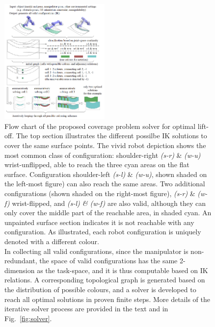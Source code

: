 \documentclass[journal]{IEEEtran}
\begin{document}
\begin{figure}[t]
\centering
\includegraphics[width = 0.48\textwidth]{figures/other_figures/newflowchart_3}
\caption{Flow chart of the proposed coverage problem solver for optimal lift-off. 
The top section illustrates the different possilbe IK solutions to cover the same surface points. The vivid robot depiction shows the most common class of configuration: shoulder-right \textit{(s-r)} \& \textit{(w-u)} wrist-unflipped, able to reach the three cyan areas on the flat surface. Configuration shoulder-left \textit{(s-l)} \& \textit{(w-u)}, shown shaded on the left-most figure) can also reach the same areas. Two additional configurations (shown shaded on the right-most figure), \textit{(s-r)} \& \textit{(w-f)} wrist-flipped, and \textit{(s-l) \& (w-f)} are also valid, although they can only cover the middle part of the reachable area, in shaded cyan. An unpainted surface section indicates it is not reachable with any configuration. As illustrated, each robot configuration is uniquely denoted with a different colour. \protect\\ 
In collecting all valid configurations, since the manipulator is non-redundant, the space of valid configurations has the same 2-dimension as the task-space, and it is thus computable based on IK relations. A corresponding topological graph is generated based on the distribution of possible colours, and a solver is developed to reach all optimal solutions in proven finite steps. More details of the iterative solver process are provided in the text and in Fig.~\ref{fig:solver}.
}

\end{figure}
\end{document}
